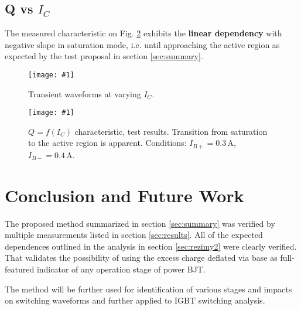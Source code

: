 \documentclass[conference]{IEEEtran}
\newcommand{\un}[1]{\, \mathrm{#1}}	%
\newcommand{\myfigsc}[3]
{
    \begin{figure}[!ht]
	\centering
	\texttt{[image: \#1]}
	\caption{#2}
	#3
    \end{figure}
}
\begin{document}
\subsection{Q vs $I_{C}$}
The measured characteristic on Fig. \ref{fig:QvsIc} exhibits the \textbf{linear dependency} with negative slope in saturation mode, i.e. until approaching the active region as expected by the test proposal in section \ref{sec:summary}.
\myfigsc{QvsIc_prieb}{Transient waveforms at varying $I_{C}$.}{\label{fig:QvsIc_prieb}}
\myfigsc{QvsIc}{$Q=f(I_{C})$ characteristic, test results. Transition from saturation to the active region is apparent. Conditions: $I_{B+}=0.3\un{A}$, $I_{B-}=0.4\un{A}$.}{\label{fig:QvsIc}}
\section{Conclusion and Future Work}
The proposed method summarized in section \ref{sec:summary} was verified by multiple measurements listed in section \ref{sec:results}.
All of the expected dependences outlined in the analysis in section \ref{sec:rezimy2} were clearly verified. That validates the possibility of using the excess charge deflated via base as full-featured indicator of any operation stage of power BJT.

The method will be further used for identification of various stages and impacts on switching waveforms and further applied to IGBT switching analysis.



\end{document}
